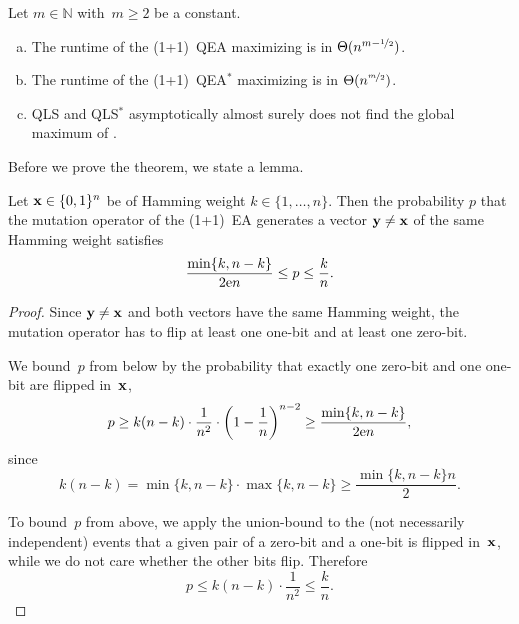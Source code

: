 \documentclass[a4paper,11pt]{article}
\begin{document}
\begin{theorem}\label{thm:jumpquantum}
Let $m\in\mathbb{N}$ with~$m\ge 2$ be a constant.
\begin{enumerate}[(a)]
\item The runtime of the (1+1)~QEA maximizing \jumpm is in $\Theta(n^{m-\nicefrac{1}{2}})$.
\item The runtime of the (1+1)~QEA$^*$ maximizing \jumpm is in $\Theta(n^{\nicefrac{m}{2}})$.
\item
QLS and QLS$^*$ asymptotically almost surely does not find the global maximum of \jumpm.
\end{enumerate}
\end{theorem}


Before we prove the theorem, we state a lemma.

\begin{lemma}\label{lem:MovingAlongLayer}
Let $\xvec \in\{0,1\}^n$ be of Hamming weight $k\in\{1,\dots,n\}$. Then the probability $p$ that the mutation operator of the (1+1)~EA generates a vector $\yvec \neq \xvec$ of the same Hamming weight satisfies
\[
\frac{\min\{k,n-k\}}{2\mathrm{e} n}\le p\le \frac{k}{n}.
\]
\end{lemma}

\begin{proof}
Since $\yvec \neq \xvec$ and both vectors have the same Hamming weight, the mutation operator has to flip at least one one-bit and at least one zero-bit.

We bound~$p$ from below by the probability that exactly one zero-bit and one one-bit are flipped in~$\xvec$,
\[
p \ge k(n-k)\cdot \frac{1}{n^2}\cdot \left(1-\frac{1}{n}\right)^{n-2}\ge\frac{\min\{k,n-k\}}{2\mathrm{e} n},
\] 
since
\[
k(n-k) = \min\{k,n-k\}\cdot\max\{k,n-k\}\ge\frac{\min\{k,n-k\}n}{2}.
\]

To bound~$p$ from above, we apply the union-bound to the (not necessarily independent) events that a given pair of a zero-bit and a one-bit is flipped in~$\xvec$, while we do not care whether the other bits flip. Therefore
\[
p \le k(n-k)\cdot \frac{1}{n^2}\le\frac{k}{n}.
\]
\end{proof} 
\end{document}
